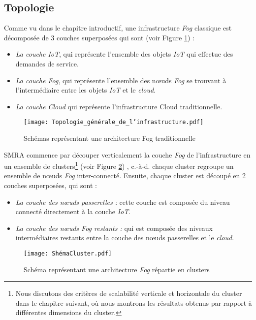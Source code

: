 \subsection{Topologie}
Comme vu dans le chapitre introductif, une infrastructure \emph{Fog} classique est décomposée de 3 couches superposées qui sont (voir Figure \ref{fig:Topologie_generale_de_linfrastructure}) :
\begin{itemize}
    \item \emph{La couche IoT}, qui représente l'ensemble des objets \emph{IoT} qui effectue des demandes de service.
    \item \emph{La couche Fog}, qui représente l'ensemble des nœuds \emph{Fog} se trouvant à l'intermédiaire entre les objets \emph{IoT} et le \emph{cloud}.
    \item \emph{La couche Cloud} qui représente l'infrastructure Cloud traditionnelle.
\end{itemize}
\begin{figure}[H]
    \centering
    \texttt{[image: Topologie\_générale\_de\_l'infrastructure.pdf]}
    \caption{Schémas représentant une architecture Fog traditionnelle}
    \label{fig:Topologie_generale_de_linfrastructure}
\end{figure}
SMRA commence par découper verticalement la couche \emph{Fog} de l'infrastructure en un ensemble de clusters\footnote{Nous discutons des critères de scalabilité verticale et horizontale du cluster dans le chapitre suivant, où nous montrons les résultats obtenus par rapport à différentes dimensions du cluster.} (voir Figure \ref{fig:Infrastructure_fog_repartie_en_cluster}) , c.-à-d. chaque cluster regroupe un ensemble de nœuds \emph{Fog} inter-connecté. Ensuite, chaque cluster est découpé en 2 couches superposées, qui sont :
\begin{itemize}
    \item \emph{La couche des nœuds passerelles :}  cette couche est composée du niveau connecté directement à la couche \emph{IoT}.
    \item \emph{La couche des nœuds Fog restants :} qui est composée des niveaux intermédiaires restants entre la couche des nœuds passerelles et le \emph{cloud}.
\end{itemize}
\begin{figure}[H]
    \centering
    \texttt{[image: ShémaCluster.pdf]}
    \caption{Schéma représentant une architecture \emph{Fog} répartie en clusters}
    \label{fig:Infrastructure_fog_repartie_en_cluster}
\end{figure}

